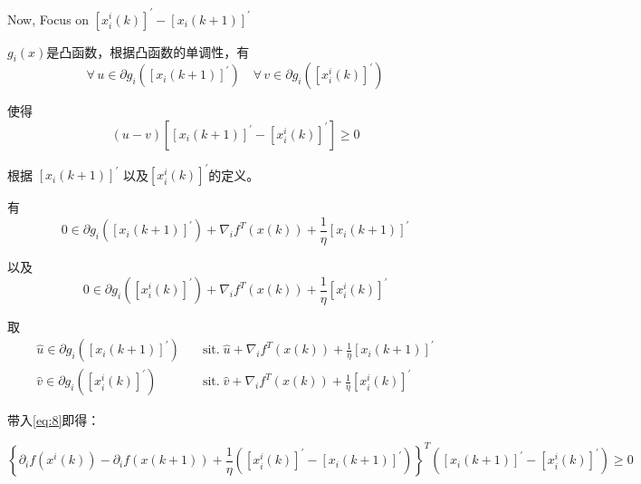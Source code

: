 \documentclass{ctexart}
\begin{document}
Now, Focus on $\left[ {x_i^i}\left(k\right) \right]^{'} - \left[{x_i}\left(k+1\right)\right]^{'}$

$g_i\left(x\right)$是凸函数，根据凸函数的单调性，有
\begin{equation}\label{eq:9}
  \forall \, u \in \partial {g_i}\left(\left[{x_i}\left(k+1\right)\right]^{'}\right) \quad \forall \, v \in \partial {g_i}\left(\left[{x_i^i}\left(k\right)\right]^{'}\right)
\end{equation}

使得
\begin{equation}\label{eq:8}
  \left( u - v \right) \left[ \left[{x_i}\left(k+1\right)\right]^{'} - \left[{x_i^i}\left(k\right)\right]^{'} \right] \geq 0
\end{equation}

根据 $\left[ {x_i}\left( k+1 \right) \right]^{'}$ 以及$ \left[ {x_i^i}\left(k\right) \right]^{'}$的定义。

有
\begin{equation}\label{eq:9}
  0 \in \partial {g_i}\left(\left[ {x_i}\left( k+1 \right) \right]^{'}\right) + \nabla_i {f^T}\left(x\left(k\right)\right) + \frac{1}{\eta}\left[ {x_i}\left( k+1 \right) \right]^{'}
\end{equation}

以及
\begin{equation}\label{eq:10}
  0 \in \partial {g_i}\left(\left[ {x_i^i}\left(k\right) \right]^{'}\right) + \nabla_i {f^T}\left(x\left(k\right)\right) + \frac{1}{\eta}\left[ {x_i^i}\left(k\right) \right]^{'}
\end{equation}

取
\begin{align}\label{eq:11}
  \hat{u} \in \partial {g_i}\left(\left[ {x_i}\left( k+1 \right) \right]^{'}\right) \quad &\text{sit.}\; \hat{u} + \nabla_i {f^T}\left(x\left(k\right)\right) + \frac{1}{\eta}\left[ {x_i}\left( k+1 \right) \right]^{'} \\
  \hat{v} \in \partial {g_i}\left(\left[ {x_i^i}\left(k\right) \right]^{'}\right) \quad & \text{sit.}\; \hat{v} + \nabla_i {f^T}\left(x\left(k\right)\right) + \frac{1}{\eta}\left[ {x_i^i}\left(k\right) \right]^{'}
\end{align}

带入\ref{eq:8}即得：

\begin{equation}\label{eq:11}
  \left\{ {\partial_i}f\left( {x^i}\left(k\right) \right) - {\partial_i}f\left( x\left( k+1 \right) \right) + \frac{1}{\eta} \left( \left[ {x_i^i}\left(k\right) \right]^{'} - \left[ {x_i}\left( k+1 \right) \right]^{'} \right) \right\}^{T} \left( \left[ {x_i}\left( k+1 \right) \right]^{'} - \left[ {x_i^i}\left(k\right) \right]^{'} \right) \geq 0
\end{equation}
\end{document}
